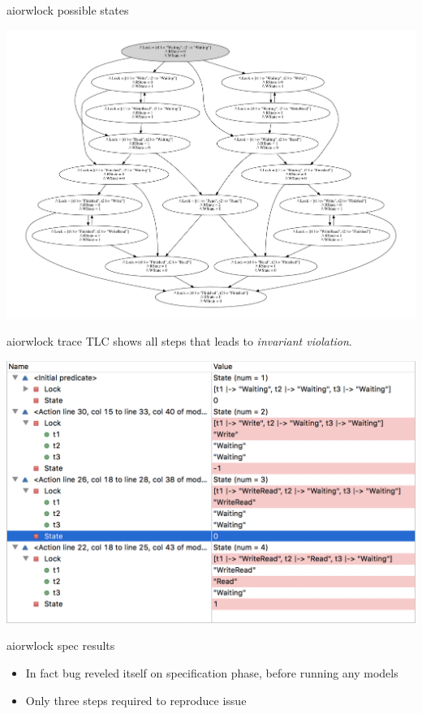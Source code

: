\documentclass[12pt]{beamer}
\begin{document}
  \begin{frame}{aiorwlock possible states}
      \begin{center}
          \includegraphics[scale=0.35,angle=90]{figures/aiorwlock_model}
      \end{center}
  \end{frame}
  \begin{frame}{aiorwlock trace}
      TLC shows all steps that leads to \textit{invariant violation}.
      \begin{center}
          \includegraphics[scale=0.45]{figures/tla_trace}
      \end{center}
  \end{frame}
  \begin{frame}{aiorwlock spec results}
    \begin{itemize}
      \item In fact bug reveled itself on specification phase, before
          running any models
      \item Only three steps required to reproduce issue
    \end{itemize}
  \end{frame}
\end{document}
